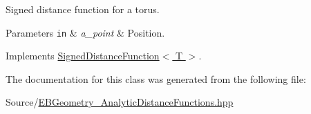 Signed distance function for a torus. 


\begin{DoxyParams}[1]{Parameters}
\mbox{\tt in}  & {\em a\+\_\+point} & Position. \\
\hline
\end{DoxyParams}


Implements \hyperlink{classSignedDistanceFunction_af5912280ca51dc21a2d6949a30ec7d21}{Signed\+Distance\+Function$<$ T $>$}.



The documentation for this class was generated from the following file\+:\begin{DoxyCompactItemize}
\item 
Source/\hyperlink{EBGeometry__AnalyticDistanceFunctions_8hpp}{E\+B\+Geometry\+\_\+\+Analytic\+Distance\+Functions.\+hpp}\end{DoxyCompactItemize}
